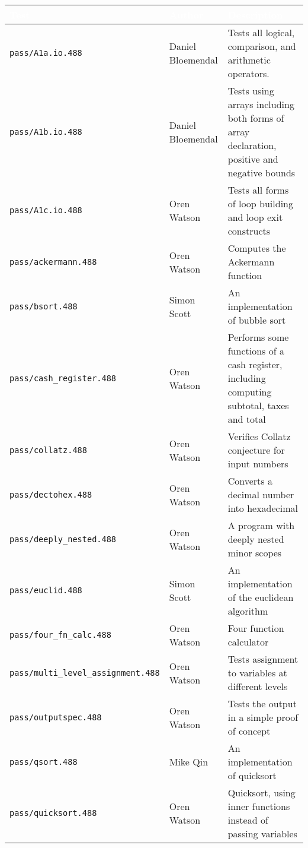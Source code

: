 \documentclass[oneside]{amsart}
\theoremstyle{definition}
\theoremstyle{remark}
\numberwithin{equation}{section}
\begin{document}
\begin{tabular}{l|l|p{8.5cm}}
\rowcolor{black!80}\textcolor{white}{\textbf{Test}} & \textcolor{white}{\textbf{Author}} & \textcolor{white}{\textbf{Description}} \\
\hline
\texttt{pass/A1a.io.488}                       & Daniel Bloemendal & Tests all logical, comparison, and arithmetic operators. \\
\texttt{pass/A1b.io.488}                       & Daniel Bloemendal & Tests using arrays including both forms of array declaration, positive and negative bounds \\
\texttt{pass/A1c.io.488}                       & Oren Watson       & Tests all forms of loop building and loop exit constructs \\
\texttt{pass/ackermann.488}                    & Oren Watson       & Computes the Ackermann function \\
\texttt{pass/bsort.488}                        & Simon Scott       & An implementation of bubble sort \\
\texttt{pass/cash\_register.488}               & Oren Watson       & Performs some functions of a cash register, including computing subtotal, taxes and total \\
\texttt{pass/collatz.488}                      & Oren Watson       & Verifies Collatz conjecture for input numbers \\
\texttt{pass/dectohex.488}                     & Oren Watson       & Converts a decimal number into hexadecimal \\
\texttt{pass/deeply\_nested.488}               & Oren Watson       & A program with deeply nested minor scopes \\
\texttt{pass/euclid.488}                       & Simon Scott       & An implementation of the euclidean algorithm \\
\texttt{pass/four\_fn\_calc.488}               & Oren Watson       & Four function calculator \\
\texttt{pass/multi\_level\_assignment.488}     & Oren Watson       & Tests assignment to variables at different levels \\
\texttt{pass/outputspec.488}                   & Oren Watson       & Tests the output in a simple proof of concept \\
\texttt{pass/qsort.488}                        & Mike Qin          & An implementation of quicksort \\
\texttt{pass/quicksort.488}                    & Oren Watson       & Quicksort, using inner functions instead of passing variables \\

\end{tabular}
\end{document}
